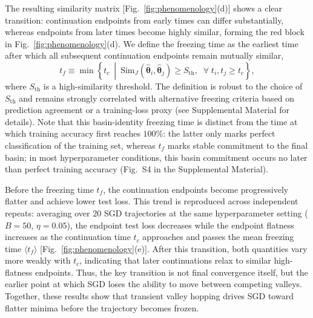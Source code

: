 \documentclass[aps,prx,reprint,superscriptaddress,longbibliography,nofootinbib,floatfix]{revtex4-2}
\begin{document}
The resulting similarity matrix [Fig.~\ref{fig:phenomenology}(d)] shows a clear transition: continuation endpoints from early times can differ substantially, whereas endpoints from later times become highly similar, forming the red block in Fig.~\ref{fig:phenomenology}(d). We define the freezing time as the earliest time after which all subsequent continuation endpoints remain mutually similar,
\begin{equation}
t_f
\equiv
\min\left\{
t_c \ \middle|\
\mathrm{Sim}_J(\hat{\bm{\theta}}_i,\hat{\bm{\theta}}_j)\ge S_{\mathrm{th}},
\;\; \forall\; t_i,t_j \geq t_c
\right\},
\label{eq:freezing_time}
\end{equation}
where $S_{\mathrm{th}}$ is a high-similarity threshold. The definition is robust to the choice of $S_{\mathrm{th}}$ and remains strongly correlated with alternative freezing criteria based on prediction agreement or a training-loss proxy (see Supplemental Material for details). Note that this basin-identity freezing time is distinct from the time at which training accuracy first reaches $100\%$: the latter only marks perfect classification of the training set, whereas $t_f$ marks stable commitment to the final basin; in most hyperparameter conditions, this basin commitment occurs no later than perfect training accuracy (Fig.~S4 in the Supplemental Material).

Before the freezing time $t_f$, the continuation endpoints become progressively flatter and achieve lower test loss. This trend is reproduced across independent repeats: averaging over 20 SGD trajectories at the same hyperparameter setting ($B=50$, $\eta=0.05$), the endpoint test loss decreases while the endpoint flatness increases as the continuation time $t_c$ approaches and passes the mean freezing time $\langle t_f\rangle$ [Fig.~\ref{fig:phenomenology}(e)]. After this transition, both quantities vary more weakly with $t_c$, indicating that later continuations relax to similar high-flatness endpoints. Thus, the key transition is not final convergence itself, but the earlier point at which SGD loses the ability to move between competing valleys. Together, these results show that transient valley hopping drives SGD toward flatter minima before the trajectory becomes frozen.
\end{document}
